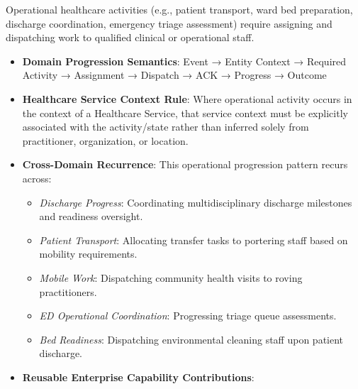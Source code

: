 Operational healthcare activities (e.g., patient transport, ward bed preparation, discharge coordination, emergency triage assessment) require assigning and dispatching work to qualified clinical or operational staff.

\label{rad:tier-model:235}

\begin{itemize}

\item
\textbf{Domain Progression Semantics}: Event → Entity Context → Required Activity → Assignment → Dispatch → ACK → Progress → Outcome



\item
\textbf{Healthcare Service Context Rule}: Where operational activity occurs in the context of a Healthcare Service, that service context must be explicitly associated with the activity/\allowbreak{}state rather than inferred solely from practitioner, organization, or location.



\item
\textbf{Cross-Domain Recurrence}: This operational progression pattern recurs across:


\begin{itemize}

\item
\emph{Discharge Progress}: Coordinating multidisciplinary discharge milestones and readiness oversight.



\item
\emph{Patient Transport}: Allocating transfer tasks to portering staff based on mobility requirements.



\item
\emph{Mobile Work}: Dispatching community health visits to roving practitioners.



\item
\emph{ED Operational Coordination}: Progressing triage queue assessments.



\item
\emph{Bed Readiness}: Dispatching environmental cleaning staff upon patient discharge.



\end{itemize}


\item
\textbf{Reusable Enterprise Capability Contributions}:



\end{itemize}

